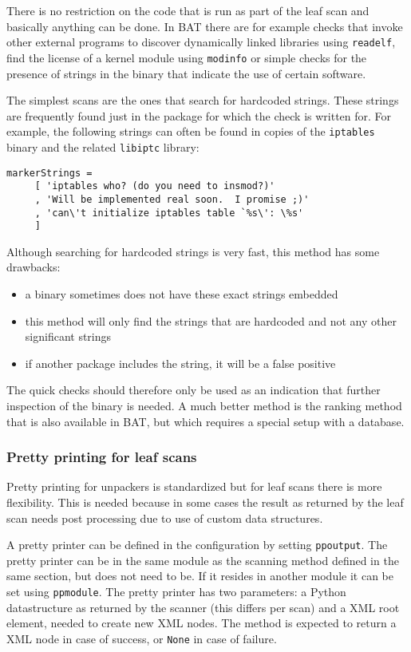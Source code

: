 \documentclass[10pt]{article}
\begin{document}
There is no restriction on the code that is run as part of the leaf scan and
basically anything can be done. In BAT there are for example checks that invoke
other external programs to discover dynamically linked libraries using
\texttt{readelf}, find the license of a kernel module using \texttt{modinfo}
or simple checks for the presence of strings in the binary that indicate the
use of certain software.

The simplest scans are the ones that search for hardcoded strings. These strings
are frequently found just in the package for which the check is written for. For
example, the following strings can often be found in copies of the
\texttt{iptables} binary and the related \texttt{libiptc} library:

\begin{verbatim}
markerStrings =
     [ 'iptables who? (do you need to insmod?)'
     , 'Will be implemented real soon.  I promise ;)'
     , 'can\'t initialize iptables table `%s\': \%s'
     ]
\end{verbatim}

Although searching for hardcoded strings is very fast, this method has some
drawbacks:

\begin{itemize}
\item a binary sometimes does not have these exact strings embedded
\item this method will only find the strings that are hardcoded and not any
other significant strings
\item if another package includes the string, it will be a false positive
\end{itemize}

The quick checks should therefore only be used as an indication that further
inspection of the binary is needed. A much better method is the ranking method
that is also available in BAT, but which requires a special setup with a
database.

\subsubsection{Pretty printing for leaf scans}

Pretty printing for unpackers is standardized but for leaf scans there is
more flexibility. This is needed because in some cases the result as returned
by the leaf scan needs post processing due to use of custom data structures.

A pretty printer can be defined in the configuration by setting
\texttt{ppoutput}. The pretty printer can be in the same module as the scanning
method defined in the same section, but does not need to be. If it resides in
another module it can be set using \texttt{ppmodule}. The pretty printer has two
parameters: a Python datastructure as returned by the scanner (this differs
per scan) and a XML root element, needed to create new XML nodes. The method is
expected to return a XML node in case of success, or \texttt{None} in case of
failure.
\end{document}
